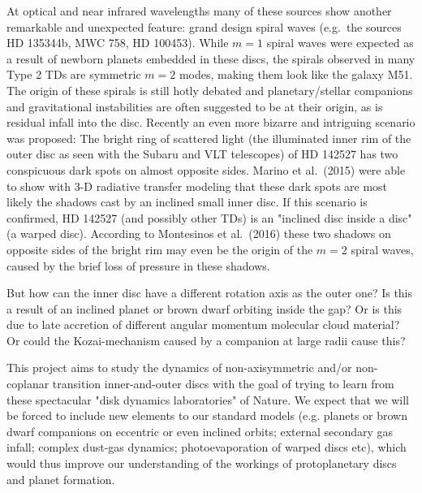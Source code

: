 At optical and near infrared wavelengths many of these sources show another
remarkable and unexpected feature: grand design spiral waves (e.g.~the
sources HD 135344b, MWC 758, HD 100453). While $m=1$ spiral waves were
expected as a result of newborn planets embedded in these discs, the spirals
observed in many Type 2 TDs are symmetric $m=2$ modes, making
them look like the galaxy M51. The origin of these spirals is still hotly
debated and planetary/stellar companions and gravitational instabilities are
often suggested to be at their origin, as is residual infall into the disc.
Recently an even more bizarre and intriguing scenario was proposed: The
bright ring of scattered light (the illuminated inner rim of the outer disc
as seen with the Subaru and VLT telescopes) of HD 142527 has two conspicuous
dark spots on almost opposite sides.  Marino et al.~(2015)
were able to show with 3-D radiative transfer modeling that these dark spots
are most likely the shadows cast by an inclined small inner disc. If this
scenario is confirmed, HD 142527 (and possibly other TDs) is an
"inclined disc inside a disc" (a warped disc). According to Montesinos et
al.~(2016) these two shadows on opposite sides of the bright
rim may even be the origin of the $m=2$ spiral waves, caused by the brief
loss of pressure in these shadows.

But how can the inner disc have a different rotation axis as the outer one?
Is this a result of an inclined planet or brown dwarf orbiting inside the
gap? Or is this due to late accretion of different angular momentum
molecular cloud material? Or could the Kozai-mechanism caused by a companion
at large radii cause this?

\vspace{0.5em}
This project aims to study the dynamics of non-axisymmetric and/or
non-coplanar transition inner-and-outer discs with the goal of trying to
learn from these spectacular "disk dynamics laboratories" of Nature. We
expect that we will be forced to include new elements to our standard models
(e.g. planets or brown dwarf companions on eccentric or even inclined
orbits; external secondary gas infall; complex dust-gas dynamics;
photoevaporation of warped discs etc), which would thus improve our
understanding of the workings of protoplanetary discs and planet formation.

